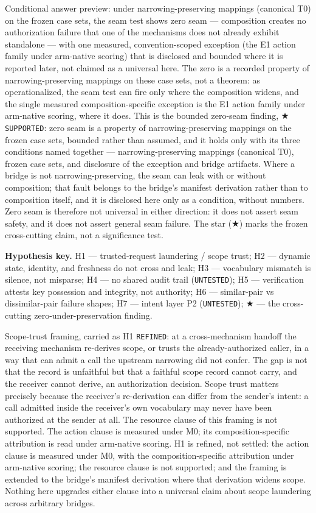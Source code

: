 \documentclass[
  10pt,
]{article}
\renewcommand{\_}{\origunderscore\allowbreak}
\begin{document}
Conditional answer preview: under narrowing-preserving mappings
(canonical T0) on the frozen case sets, the seam test shows zero seam
--- composition creates no authorization failure that one of the
mechanisms does not already exhibit standalone --- with one measured,
convention-scoped exception (the E1 action family under arm-native
scoring) that is disclosed and bounded where it is reported later, not
claimed as a universal here. The zero is a recorded property of
narrowing-preserving mappings on these case sets, not a theorem: as
operationalized, the seam test can fire only where the composition
widens, and the single measured composition-specific exception is the E1
action family under arm-native scoring, where it does. This is the
bounded zero-seam finding, ★ \texttt{SUPPORTED}: zero seam is a property
of narrowing-preserving mappings on the frozen case sets, bounded rather
than assumed, and it holds only with its three conditions named together
--- narrowing-preserving mappings (canonical T0), frozen case sets, and
disclosure of the exception and bridge artifacts. Where a bridge is not
narrowing-preserving, the seam can leak with or without composition;
that fault belongs to the bridge's manifest derivation rather than to
composition itself, and it is disclosed here only as a condition,
without numbers. Zero seam is therefore not universal in either
direction: it does not assert seam safety, and it does not assert
general seam failure. The star (★) marks the frozen cross-cutting claim,
not a significance test.

\textbf{Hypothesis key.} H1 --- trusted-request laundering / scope
trust; H2 --- dynamic state, identity, and freshness do not cross and
leak; H3 --- vocabulary mismatch is silence, not misparse; H4 --- no
shared audit trail (\texttt{UNTESTED}); H5 --- verification attests key
possession and integrity, not authority; H6 --- similar-pair vs
dissimilar-pair failure shapes; H7 --- intent layer P2
(\texttt{UNTESTED}); ★ --- the cross-cutting zero-under-preservation
finding.

Scope-trust framing, carried as H1 \texttt{REFINED}: at a
cross-mechanism handoff the receiving mechanism re-derives scope, or
trusts the already-authorized caller, in a way that can admit a call the
upstream narrowing did not confer. The gap is not that the record is
unfaithful but that a faithful scope record cannot carry, and the
receiver cannot derive, an authorization decision. Scope trust matters
precisely because the receiver's re-derivation can differ from the
sender's intent: a call admitted inside the receiver's own vocabulary
may never have been authorized at the sender at all. The resource clause
of this framing is not supported. The action clause is measured under
M0; its composition-specific attribution is read under arm-native
scoring. H1 is refined, not settled: the action clause is measured under
M0, with the composition-specific attribution under arm-native scoring;
the resource clause is not supported; and the framing is extended to the
bridge's manifest derivation where that derivation widens scope. Nothing
here upgrades either clause into a universal claim about scope
laundering across arbitrary bridges.
\end{document}
